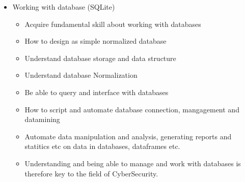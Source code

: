 \begin{itemize}
    \item Working with database (SQLite)
        \begin{itemize}
            \item Acquire fundamental skill about working with databases
            \item How to design as simple normalized database
            \item Understand database storage and data structure
            \item Understand database Normalization
            \item Be able to query and interface with databases
            \item How to script and automate database connection, mangagement and datamining
            \item Automate data manipulation and analysis, generating reports and statitics etc on data in databases, dataframes etc.
            \item Understanding and being able to manage and  work with databases is therefore key to the field of CyberSecurity.
        \end{itemize}
\end{itemize}